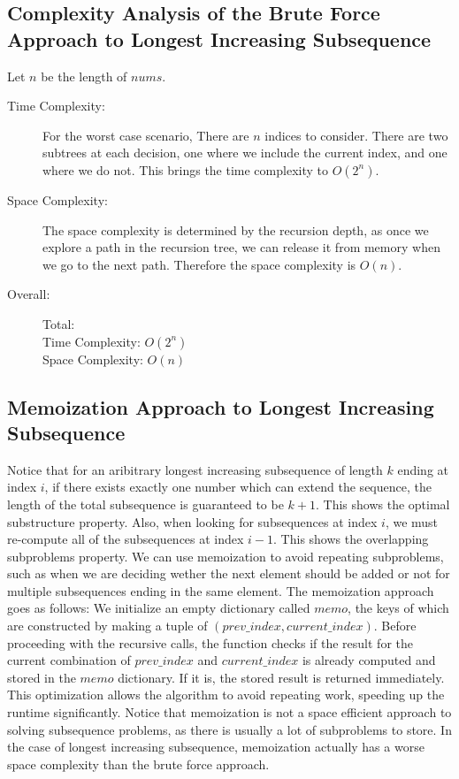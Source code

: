 \subsection{Complexity Analysis of the Brute Force Approach to Longest Increasing Subsequence}
Let $n$ be the length of $nums$.
\begin{description}
    \item[Time Complexity:]
        For the worst case scenario, There are $n$ indices to consider.
        There are two subtrees at each decision, one where we include the current index, and one where we do not.
        This brings the time complexity to $O(2^n)$.
        
    \item[Space Complexity:] 
        The space complexity is determined by the recursion depth,
        as once we explore a path in the recursion tree, we can release it from memory when we go to the next path.
        Therefore the space complexity is $O(n)$.
        
        
    \item[Overall:] Total:\\
        Time Complexity: $O(2^n)$\\
        Space Complexity: $O(n)$
        

\end{description}


\subsection{Memoization Approach to Longest Increasing Subsequence}

Notice that for an aribitrary longest increasing subsequence of length $k$ ending at index $i$,
if there exists exactly one number which can extend the sequence, the length of the total subsequence is guaranteed to be $k+1$.
This shows the optimal substructure property.
Also, when looking for subsequences at index $i$,
we must re-compute all of the subsequences at index $i-1$.
This shows the overlapping subproblems property.
We can use memoization to avoid repeating subproblems, such as when we are deciding wether the next element should be added or not for multiple subsequences ending in the same element.
The memoization approach goes as follows:
We initialize an empty dictionary called $memo$,
the keys of which are constructed by making a tuple of $(prev\_index, current\_index)$.
Before proceeding with the recursive calls, the function checks if the result for the current combination of $prev\_index$ and $current\_index$ is already computed and stored in the $memo$ dictionary.
If it is, the stored result is returned immediately.
This optimization allows the algorithm to avoid repeating work,
speeding up the runtime significantly.
Notice that memoization is not a space efficient approach to solving subsequence problems, as there is usually a lot of subproblems to store. In the case of longest increasing subsequence, memoization actually has a worse space complexity than the brute force approach.

